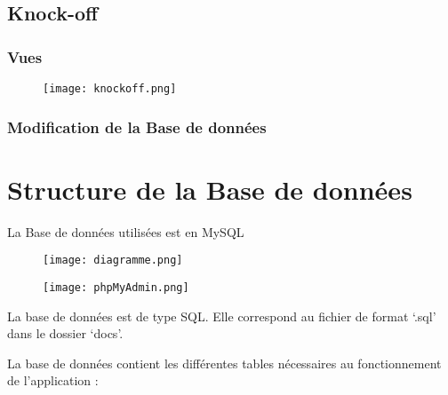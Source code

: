 \documentclass{article}
\begin{document}
\subsection{Knock-off}

\subsubsection{Vues}

\begin{figure}[h!]
\centering
\texttt{[image: knockoff.png]}
\caption{}
\end{figure}

\subsubsection{Modification de la Base de données}


\section{Structure de la Base de données}
La Base de données utilisées est en MySQL

\begin{figure}[h!]
\centering
\texttt{[image: diagramme.png]}
\caption{}
\end{figure}

\begin{figure}[h!]
\centering
\texttt{[image: phpMyAdmin.png]}
\caption{}
\end{figure}

La  base  de  données  est  de  type SQL. Elle  correspond  au  fichier  de  format  ‘.sql’  dans  le dossier ‘docs’.

La  base  de  données  contient  les  différentes  tables  nécessaires  au  fonctionnement  de l’application :
\end{document}
